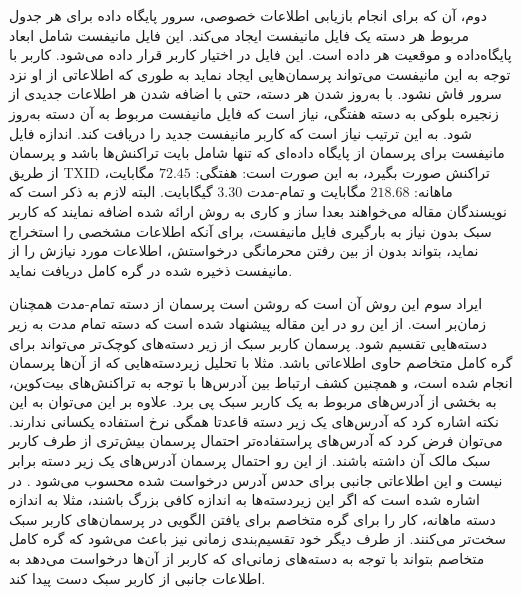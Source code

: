 دوم، آن که برای انجام بازیابی اطلاعات خصوصی، سرور پایگاه داده برای هر جدول مربوط هر دسته یک فایل مانیفست ایجاد می‌کند. این فایل مانیفست شامل ابعاد پایگاه‌داده و موقعیت هر داده است. این فایل در اختیار کاربر قرار داده می‌شود. کاربر با توجه به این مانیفست می‌تواند پرسمان‌هایی ایجاد نماید به طوری که اطلاعاتی از او نزد سرور فاش نشود. با به‌روز شدن هر دسته، حتی با اضافه شدن هر اطلاعات جدیدی از زنجیره بلوکی به دسته هفتگی، نیاز است که فایل مانیفست مربوط به آن دسته به‌روز شود. به این ترتیب نیاز است که کاربر مانیفست جدید را دریافت کند. اندازه فایل مانیفست برای پرسمان از پایگاه داده‌ای که تنها شامل بایت‌ تراکنش‌ها باشد و پرسمان از طریق TXID تراکنش صورت بگیرد، به این صورت است: هفتگی: $72.45$ مگابایت، ماهانه: $218.68$ مگابایت و تمام-مدت $3.30$ گیگابایت. البته لازم به ذکر است که نویسندگان مقاله \cite{Qin2019} می‌خواهند بعدا ساز و کاری به روش ارائه شده اضافه نمایند که کاربر سبک بدون نیاز به بارگیری فایل مانیفست، برای آنکه اطلاعات مشخصی را استخراج نماید، بتواند بدون از بین رفتن محرمانگی درخواستش، اطلاعات مورد نیازش را از مانیفست ذخیره شده در گره کامل دریافت نماید.

ایراد سوم این روش آن است که روشن است پرسمان از دسته تمام-مدت همچنان زمان‌بر است. از این رو در این مقاله پیشنهاد شده است که دسته تمام مدت به زیر دسته‌‌هایی تقسیم شود.  پرسمان کاربر سبک از زیر دسته‌های کوچک‌تر می‌تواند برای گره کامل متخاصم حاوی اطلاعاتی باشد. مثلا با تحلیل زیردسته‌هایی که از آن‌ها پرسمان انجام شده است، و همچنین کشف ارتباط بین آدرس‌ها با توجه به تراکنش‌های بیت‌کوین، به بخشی از آدرس‌های مربوط به یک کاربر سبک پی برد. علاوه بر این می‌توان به این نکته اشاره کرد که آدرس‌های یک زیر دسته قاعدتا همگی نرخ استفاده یکسانی ندارند. می‌توان فرض کرد که آدرس‌های پراستفاده‌تر احتمال پرسمان بیش‌تری از طرف کاربر سبک مالک آن داشته باشند. از این رو احتمال پرسمان آدرس‌های یک زیر دسته برابر نیست و این اطلاعاتی جانبی برای حدس آدرس درخواست شده محسوب می‌شود \cite{Niu2015}. در \cite{Qin2019} اشاره شده است که اگر این زیردسته‌ها به اندازه کافی بزرگ باشند، مثلا به اندازه دسته ماهانه، کار را برای گره متخاصم برای یافتن الگویی در پرسمان‌های کاربر سبک سخت‌تر می‌کنند. از طرف دیگر خود تقسیم‌بندی زمانی نیز باعث می‌شود که گره کامل متخاصم بتواند با توجه به دسته‌های زمانی‌ای که کاربر از آن‌ها درخواست می‌دهد به اطلاعات جانبی از کاربر سبک دست پیدا کند. 


